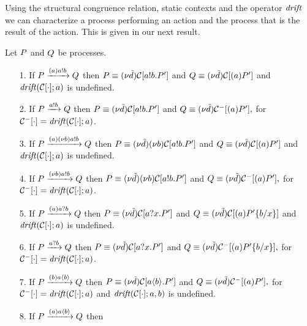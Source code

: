 Using the structural congruence relation, static contexts and the operator $\mathit {drift}$ we can characterize a process performing an action and the process that is the result of the action. This is given in our next result.

\begin{lemma}{\label{lemm:inv_on_lts}}
Let $P$ and $Q$ be processes.
\begin{itemize}
\item[1.] If $P\xrightarrow{{(a)}a!b}Q$ then
 $P\equiv(\nu \tilde {d})\mathcal{C}[a!b.P']$ and $Q\equiv(\nu \tilde {d})\mathcal{C}[(a)P']$ and $\mathit {drift}(\mathcal{C}[\cdot]; a)$ is undefined.
\item[2.] If $P\xrightarrow{a!b}Q$ then
 $P\equiv(\nu \tilde {d})\mathcal{C}[a!b.P']$ and $Q\equiv(\nu \tilde {d})\mathcal{C}^-[(a)P'],$ for $\mathcal{C}^-[\cdot]=\mathit {drift}(\mathcal{C}[\cdot]; a)$.
\item[3.] If $P\xrightarrow{{(a)}(\nu b)a!b}Q$ then 
$P\equiv(\nu \tilde {d})(\nu b)\mathcal{C}[a!b.P']$ and 
$Q\equiv(\nu \tilde {d})\mathcal{C}[(a)P']$ and $\mathit {drift}(\mathcal{C}[\cdot]; a)$ is undefined.
\item[4.] If $P\xrightarrow{(\nu b)a!b}Q$ then 
$P\equiv(\nu \tilde {d})(\nu b)\mathcal{C}[a!b.P']$ and 
$Q\equiv(\nu \tilde {d})\mathcal{C}^-[(a)P'],$ for $\mathcal{C}^-[\cdot]=\mathit {drift}(\mathcal{C}[\cdot]; a)$.
\item[5.] If $P\xrightarrow{{(a)}a?b}Q$ then 
$P\equiv(\nu \tilde {d})\mathcal{C}[a?x.P']$ and 
$Q\equiv(\nu \tilde {d})\mathcal{C}[(a)P'\{b/x\}]$ and $\mathit {drift}(\mathcal{C}[\cdot]; a)$ is undefined. 
\item[6.] If $P\xrightarrow{a?b}Q$ then 
$P\equiv(\nu \tilde {d})\mathcal{C}[a?x.P']$ and 
$Q\equiv(\nu \tilde {d})\mathcal{C}^-[(a)P'\{b/x\}],$ for $\mathcal{C}^-[\cdot]=\mathit {drift}(\mathcal{C}[\cdot]; a)$. 
\item[7.] If $P\xrightarrow{{(b)}a\langle b\rangle}Q$ then 
$P\equiv(\nu \tilde {d})\mathcal{C}[a\langle b\rangle.P']$ and  
$Q\equiv(\nu \tilde {d})\mathcal{C}^-[(a)P'],$ for $\mathcal{C}^-[\cdot]=\mathit {drift}(\mathcal{C}[\cdot]; a)$ and  $\mathit {drift}(\mathcal{C}[\cdot]; a,b)$ is undefined.
\item[8.] If $P\xrightarrow{{(a)}a\langle b\rangle}Q$ then 

\end{itemize}
\end{lemma}
